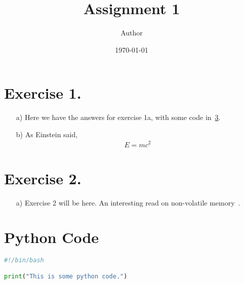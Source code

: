\documentclass{article}
\title{Assignment 1}
\author{Author}
\date{\today}
\begin{document}
\maketitle

\section{Exercise 1.}
\begin{enumerate}
    \item [a)] Here we have the answers for exercise 1a, with some code in~\ref{appendix:python_code}.

    \item [b)] As Einstein said,
          \begin{equation*}
              \begin{split}
                  E = mc^2
              \end{split}
          \end{equation*}
\end{enumerate}

\section{Exercise 2.}
\begin{enumerate}
    \item [a)]  Exercise 2 will be here. An interesting read on non-volatile memory~\cite{inproceedings:pmemguide}.
\end{enumerate}




\appendix
\section{Python Code}
\label{appendix:python_code}
\begin{lstlisting}[language=Python, caption={\raggedright Some python Code.}]
#!/bin/bash

print("This is some python code.")
\end{lstlisting}
\end{document}
